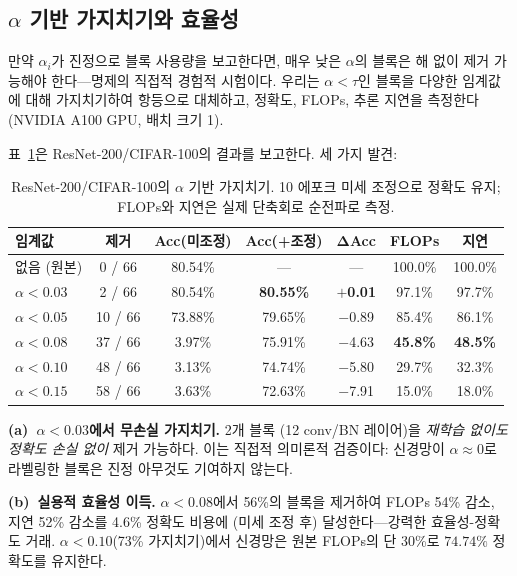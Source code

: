 \documentclass{bmvc2k}
\begin{document}
\subsection{$\alpha$ 기반 가지치기와 효율성}
\label{sec:pruning}

만약 $\alpha_i$가 진정으로 블록 사용량을 보고한다면, 매우 낮은 $\alpha$의 블록은 해 없이 제거 가능해야 한다---명제의 직접적 경험적 시험이다. 우리는 $\alpha < \tau$인 블록을 다양한 임계값에 대해 가지치기하여 항등으로 대체하고, 정확도, FLOPs, 추론 지연을 측정한다 (NVIDIA A100 GPU, 배치 크기 1).

표~\ref{tab:pruning}은 ResNet-200/CIFAR-100의 결과를 보고한다. 세 가지 발견:

\begin{table}[!ht]
\centering
\small
\caption{ResNet-200/CIFAR-100의 $\alpha$ 기반 가지치기. 10 에포크 미세 조정으로 정확도 유지; FLOPs와 지연은 실제 단축회로 순전파로 측정.}
\label{tab:pruning}
\begin{tabular}{lcccccc}
\toprule
\textbf{임계값} & \textbf{제거} & \textbf{Acc(미조정)} & \textbf{Acc(+조정)} & $\mathbf{\Delta}$\textbf{Acc} & \textbf{FLOPs} & \textbf{지연} \\
\midrule
없음 (원본) & 0 / 66 & 80.54\% & --- & --- & 100.0\% & 100.0\% \\
$\alpha < 0.03$ & 2 / 66 & 80.54\% & \textbf{80.55\%} & \textbf{$+$0.01} & 97.1\% & 97.7\% \\
$\alpha < 0.05$ & 10 / 66 & 73.88\% & 79.65\% & $-$0.89 & 85.4\% & 86.1\% \\
$\alpha < 0.08$ & 37 / 66 & 3.97\% & 75.91\% & $-$4.63 & \textbf{45.8\%} & \textbf{48.5\%} \\
$\alpha < 0.10$ & 48 / 66 & 3.13\% & 74.74\% & $-$5.80 & 29.7\% & 32.3\% \\
$\alpha < 0.15$ & 58 / 66 & 3.63\% & 72.63\% & $-$7.91 & 15.0\% & 18.0\% \\
\bottomrule
\end{tabular}
\end{table}

\textbf{(a)~$\alpha < 0.03$에서 무손실 가지치기.} 2개 블록 (12 conv/BN 레이어)을 \emph{재학습 없이도} \emph{정확도 손실 없이} 제거 가능하다. 이는 직접적 의미론적 검증이다: 신경망이 $\alpha \approx 0$로 라벨링한 블록은 진정 아무것도 기여하지 않는다.

\textbf{(b)~실용적 효율성 이득.} $\alpha < 0.08$에서 56\%의 블록을 제거하여 FLOPs 54\% 감소, 지연 52\% 감소를 4.6\% 정확도 비용에 (미세 조정 후) 달성한다---강력한 효율성-정확도 거래. $\alpha < 0.10$(73\% 가지치기)에서 신경망은 원본 FLOPs의 단 30\%로 $74.74\%$ 정확도를 유지한다.
\end{document}
